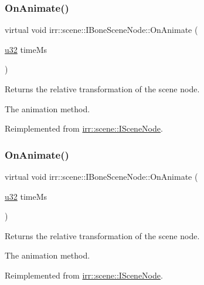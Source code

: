 \subsubsection{\texorpdfstring{On\+Animate()}{OnAnimate()}\hspace{0.1cm}{\footnotesize\ttfamily [1/2]}}
{\footnotesize\ttfamily virtual void irr\+::scene\+::\+I\+Bone\+Scene\+Node\+::\+On\+Animate (\begin{DoxyParamCaption}\item[{\hyperlink{namespaceirr_a0416a53257075833e7002efd0a18e804}{u32}}]{time\+Ms }\end{DoxyParamCaption})\hspace{0.3cm}{\ttfamily [pure virtual]}}



Returns the relative transformation of the scene node. 

The animation method. 

Reimplemented from \hyperlink{classirr_1_1scene_1_1ISceneNode_afc1dcb5cb19116d0c7aa3d4ebdf04cc5}{irr\+::scene\+::\+I\+Scene\+Node}.

\mbox{\label{classirr_1_1scene_1_1IBoneSceneNode_a7e21d0722e5b105e4d2a956bff110a7f}} 
\subsubsection{\texorpdfstring{On\+Animate()}{OnAnimate()}\hspace{0.1cm}{\footnotesize\ttfamily [2/2]}}
{\footnotesize\ttfamily virtual void irr\+::scene\+::\+I\+Bone\+Scene\+Node\+::\+On\+Animate (\begin{DoxyParamCaption}\item[{\hyperlink{namespaceirr_a0416a53257075833e7002efd0a18e804}{u32}}]{time\+Ms }\end{DoxyParamCaption})\hspace{0.3cm}{\ttfamily [pure virtual]}}



Returns the relative transformation of the scene node. 

The animation method. 

Reimplemented from \hyperlink{classirr_1_1scene_1_1ISceneNode_afc1dcb5cb19116d0c7aa3d4ebdf04cc5}{irr\+::scene\+::\+I\+Scene\+Node}.


